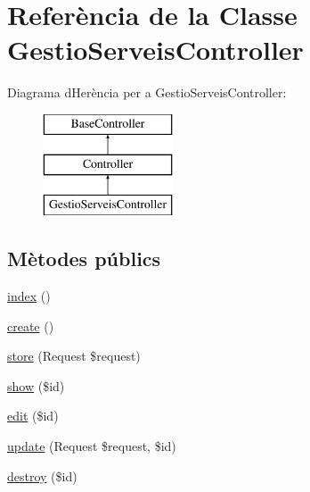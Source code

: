 \hypertarget{class_app_1_1_http_1_1_controllers_1_1_gestio_serveis_controller}{}\section{Referència de la Classe Gestio\+Serveis\+Controller}
\label{class_app_1_1_http_1_1_controllers_1_1_gestio_serveis_controller}
Diagrama d\textquotesingle{}Herència per a Gestio\+Serveis\+Controller\+:\begin{figure}[H]
\begin{center}
\leavevmode
\includegraphics[height=3.000000cm]{class_app_1_1_http_1_1_controllers_1_1_gestio_serveis_controller}
\end{center}
\end{figure}
\subsection*{Mètodes públics}
\begin{DoxyCompactItemize}
\item 
\mbox{\hyperlink{class_app_1_1_http_1_1_controllers_1_1_gestio_serveis_controller_a149eb92716c1084a935e04a8d95f7347}{index}} ()
\item 
\mbox{\hyperlink{class_app_1_1_http_1_1_controllers_1_1_gestio_serveis_controller_a435e7d7525d4bcd0ed5e34a469f3adf6}{create}} ()
\item 
\mbox{\hyperlink{class_app_1_1_http_1_1_controllers_1_1_gestio_serveis_controller_a9ef485163104597c12185b53cdacf638}{store}} (Request \$request)
\item 
\mbox{\hyperlink{class_app_1_1_http_1_1_controllers_1_1_gestio_serveis_controller_ae4914d07a9bbe4aede7a5dea759f6287}{show}} (\$id)
\item 
\mbox{\hyperlink{class_app_1_1_http_1_1_controllers_1_1_gestio_serveis_controller_a459ed16587e3a50b39b672c7e473abc5}{edit}} (\$id)
\item 
\mbox{\hyperlink{class_app_1_1_http_1_1_controllers_1_1_gestio_serveis_controller_affb03cc19897a1800a0f411264d6c7cc}{update}} (Request \$request, \$id)
\item 
\mbox{\hyperlink{class_app_1_1_http_1_1_controllers_1_1_gestio_serveis_controller_a726fa8a4b4b187b9ca32ba427aac8137}{destroy}} (\$id)
\end{DoxyCompactItemize}


